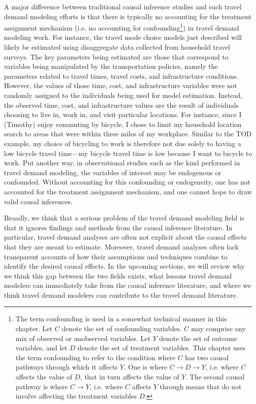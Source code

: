 A major difference between traditional causal inference studies and such travel demand modeling efforts is that there is typically no accounting for the treatment assignment mechanism (i.e. no accounting for confounding\footnote{The term confounding is used in a somewhat technical manner in this chapter. Let $C$ denote the set of confounding variables. $C$ may comprise any mix of observed or unobserved variables. Let $Y$ denote the set of outcome variables, and let $D$ denote the set of treatment variables. This chapter uses the term confounding to refer to the condition where $C$ has two causal pathways through which it affects $Y$. One is where $C \rightarrow D \rightarrow Y$, i.e. where $C$ affects the value of $D$, that in turn affects the value of $Y$. The second causal pathway is where $C \rightarrow Y$, i.e. where $C$ affects $Y$ through means that do not involve affecting the treatment variables $D$.}) in travel demand modeling work. For instance, the travel mode choice models just described will likely be estimated using disaggregate data collected from household travel surveys. The key parameters being estimated are those that correspond to variables being manipulated by the transportation policies, namely the parameters related to travel times, travel costs, and infrastructure conditions. However, the values of those time, cost, and infrastructure variables were not randomly assigned to the individuals being used for model estimation. Instead, the observed time, cost, and infrastructure values are the result of individuals choosing to live in, work in, and visit particular locations. For instance, since I (Timothy) enjoy commuting by bicycle, I chose to limit my household location search to areas that were within three miles of my workplace. Similar to the TOD example, my choice of bicycling to work is therefore not due solely to having a low bicycle travel time---my bicycle travel time is low because I want to bicycle to work. Put another way, in observational studies such as the kind performed in travel demand modeling, the variables of interest may be endogenous or confounded. Without accounting for this confounding or endogeneity, one has not accounted for the treatment assignment mechanism, and one cannot hope to draw valid causal inferences.

Broadly, we think that a serious problem of the travel demand modeling field is that it ignores findings and methods from the causal inference literature. In particular, travel demand analyses are often not explicit about the causal effects that they are meant to estimate. Moreover, travel demand analyses often lack transparent accounts of how their assumptions and techniques combine to identify the desired causal effects. In the upcoming sections, we will review why we think this gap between the two fields exists, what lessons travel demand modelers can immediately take from the causal inference literature, and where we think travel demand modelers can contribute to the travel demand literature.

